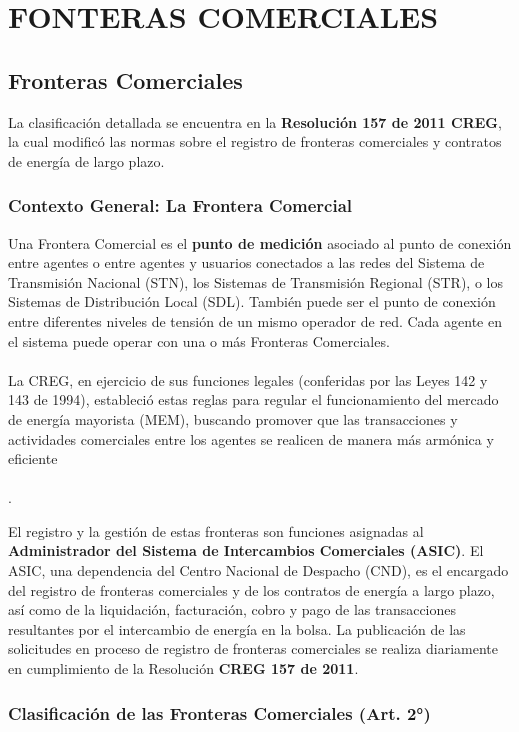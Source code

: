 \documentclass[a5paper]{book}%
\begin{document}
\chapter{FONTERAS COMERCIALES}  

\section{Fronteras Comerciales}
La clasificación detallada se encuentra en la \textbf{Resolución 157 de 2011 CREG}, la cual modificó las normas sobre el registro de fronteras comerciales y contratos de energía de largo plazo.

\subsection{Contexto General: La Frontera Comercial}

Una Frontera Comercial es el \textbf{punto de medición} asociado al punto de conexión entre agentes o entre agentes y usuarios conectados a las redes del Sistema de Transmisión Nacional (STN), los Sistemas de Transmisión Regional (STR), o los Sistemas de Distribución Local (SDL). También puede ser el punto de conexión entre diferentes niveles de tensión de un mismo operador de red. Cada agente en el sistema puede operar con una o más Fronteras Comerciales.\\\\

La CREG, en ejercicio de sus funciones legales (conferidas por las Leyes 142 y 143 de 1994), estableció estas reglas para regular el funcionamiento del mercado de energía mayorista (MEM), buscando promover que las transacciones y actividades comerciales entre los agentes se realicen de manera más armónica y eficiente\\\\.

El registro y la gestión de estas fronteras son funciones asignadas al \textbf{Administrador del Sistema de Intercambios Comerciales (ASIC)}. El ASIC, una dependencia del Centro Nacional de Despacho (CND), es el encargado del registro de fronteras comerciales y de los contratos de energía a largo plazo, así como de la liquidación, facturación, cobro y pago de las transacciones resultantes por el intercambio de energía en la bolsa. La publicación de las solicitudes en proceso de registro de fronteras comerciales se realiza diariamente en cumplimiento de la Resolución \textbf{CREG 157 de 2011}.

\subsection{Clasificación de las Fronteras Comerciales (Art. 2°)}
\end{document}
